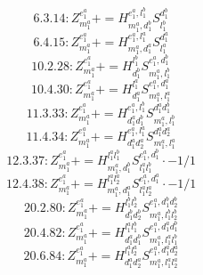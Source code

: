 \documentclass[letterpaper,10pt,fleqn,leqno,onecolumn]{article}
\begin{document}
\begin{equation} \;\;\;\;\;\;  6.3.14: Z^{e_{1}^{a}}_{m_{1}^{a}}+=H^{e_{1}^{a},l_{1}^{b}}_{m_{1}^{a},d_{1}^{b}}S^{d_{1}^{b}}_{l_{1}^{b}} \end{equation}
\begin{equation} \;\;\;\;\;\;  6.4.15: Z^{e_{1}^{a}}_{m_{1}^{a}}+=H^{e_{1}^{a},l_{1}^{a}}_{m_{1}^{a},d_{1}^{a}}S^{d_{1}^{a}}_{l_{1}^{a}} \end{equation}
\begin{equation} \;\;\;\;\;\;  10.2.28: Z^{e_{1}^{a}}_{m_{1}^{a}}+=H^{l_{1}^{b}}_{d_{1}^{b}}S^{e_{1}^{a},d_{1}^{b}}_{m_{1}^{a},l_{1}^{b}} \end{equation}
\begin{equation} \;\;\;\;\;\;  10.4.30: Z^{e_{1}^{a}}_{m_{1}^{a}}+=H^{l_{1}^{a}}_{d_{1}^{a}}S^{e_{1}^{a},d_{1}^{a}}_{m_{1}^{a},l_{1}^{a}} \end{equation}
\begin{equation} \;\;\;\;\;\;  11.3.33: Z^{e_{1}^{a}}_{m_{1}^{a}}+=H^{e_{1}^{a},l_{1}^{b}}_{d_{1}^{a}d_{1}^{b}}S^{d_{1}^{a}d_{1}^{b}}_{m_{1}^{a},l_{1}^{b}} \end{equation}
\begin{equation} \;\;\;\;\;\;  11.4.34: Z^{e_{1}^{a}}_{m_{1}^{a}}+=H^{e_{1}^{a},l_{1}^{a}}_{d_{1}^{a}d_{2}^{a}}S^{d_{1}^{a}d_{2}^{a}}_{m_{1}^{a},l_{1}^{a}} \end{equation}
\begin{equation} \;\;\;\;\;\;  12.3.37: Z^{e_{1}^{a}}_{m_{1}^{a}}+=H^{l_{1}^{a}l_{1}^{b}}_{m_{1}^{a},d_{1}^{b}}S^{e_{1}^{a},d_{1}^{b}}_{l_{1}^{a}l_{1}^{b}}\cdot -1/1 \end{equation}
\begin{equation} \;\;\;\;\;\;  12.4.38: Z^{e_{1}^{a}}_{m_{1}^{a}}+=H^{l_{1}^{a}l_{2}^{a}}_{m_{1}^{a},d_{1}^{a}}S^{e_{1}^{a},d_{1}^{a}}_{l_{1}^{a}l_{2}^{a}}\cdot -1/1 \end{equation}
\begin{equation} \;\;\;\;\;\;  20.2.80: Z^{e_{1}^{a}}_{m_{1}^{a}}+=H^{l_{1}^{b}l_{2}^{b}}_{d_{1}^{b}d_{2}^{b}}S^{e_{1}^{a},d_{1}^{b}d_{2}^{b}}_{m_{1}^{a},l_{1}^{b}l_{2}^{b}} \end{equation}
\begin{equation} \;\;\;\;\;\;  20.4.82: Z^{e_{1}^{a}}_{m_{1}^{a}}+=H^{l_{1}^{a}l_{1}^{b}}_{d_{1}^{a}d_{1}^{b}}S^{e_{1}^{a},d_{1}^{a}d_{1}^{b}}_{m_{1}^{a},l_{1}^{a}l_{1}^{b}} \end{equation}
\begin{equation} \;\;\;\;\;\;  20.6.84: Z^{e_{1}^{a}}_{m_{1}^{a}}+=H^{l_{1}^{a}l_{2}^{a}}_{d_{1}^{a}d_{2}^{a}}S^{e_{1}^{a},d_{1}^{a}d_{2}^{a}}_{m_{1}^{a},l_{1}^{a}l_{2}^{a}} \end{equation}
\end{document}
